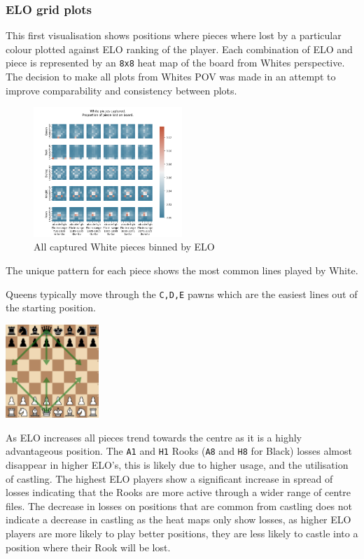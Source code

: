 \documentclass[11pt]{article}
\begin{document}
\subsubsection{ELO grid plots}
\label{sec:org6771566}
This first visualisation shows positions where pieces where lost by a particular colour plotted against ELO ranking of the player. Each combination of ELO and piece is represented by an \texttt{8x8} heat map of the board from Whites perspective. The decision to make all plots from Whites POV was made in an attempt to improve comparability and consistency between plots.
\begin{figure}
\centering
\includegraphics[width=0.5\textwidth]{Images/_HEATMAP_Queen_Rook_Bishop_Knight_Pawn_WHITE_ELO.png}
\caption{All captured White pieces binned by ELO}
\end{figure}

The unique pattern for each piece shows the most common lines played by White.

Queens typically move through the \texttt{C,D,E} pawns which are the easiest lines out of the starting position.
\begin{center}
\includegraphics[width=100pt]{Images/Queen lines.png}
\end{center}

As ELO increases all pieces trend towards the centre as it is a highly advantageous position. The \texttt{A1} and \texttt{H1} Rooks (\texttt{A8} and \texttt{H8} for Black) losses almost disappear in higher ELO's, this is likely due to higher usage, and the utilisation of castling. The highest ELO players show a significant increase in spread of losses indicating that the Rooks are more active through a wider range of centre files.
The decrease in losses on positions that are common from castling does not indicate a decrease in castling as the heat maps only show losses, as higher ELO players are more likely to play better positions, they are less likely to castle into a position where their Rook will be lost.
\end{document}
